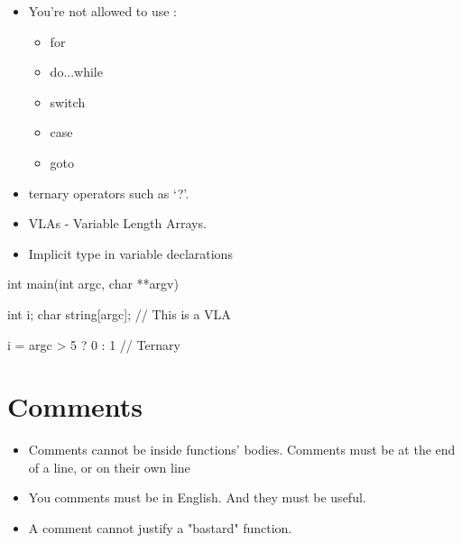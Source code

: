 \documentclass{42-en}
\begin{document}
        \begin{itemize}

            \item You're not allowed to use :

                \begin{itemize}

                    \item for
                    \item do...while
                    \item switch
                    \item case
                    \item goto

                \end{itemize}

            \item ternary operators such as `?'.

            \item VLAs - Variable Length Arrays.

            \item Implicit type in variable declarations

        \end{itemize}
        \begin{42ccode}
    int main(int argc, char **argv)
    {
        int     i;
        char    string[argc]; // This is a VLA

        i = argc > 5 ? 0 : 1 // Ternary
    }
        \end{42ccode}
        \newpage

    \section{Comments}

        \begin{itemize}

            \item Comments cannot be inside functions' bodies.
                Comments must be at the end of a line, or on their own line

            \item You comments must be in English. And they must be
                useful.

            \item A comment cannot justify a "bastard" function.

        \end{itemize}
        \newpage
\end{document}

